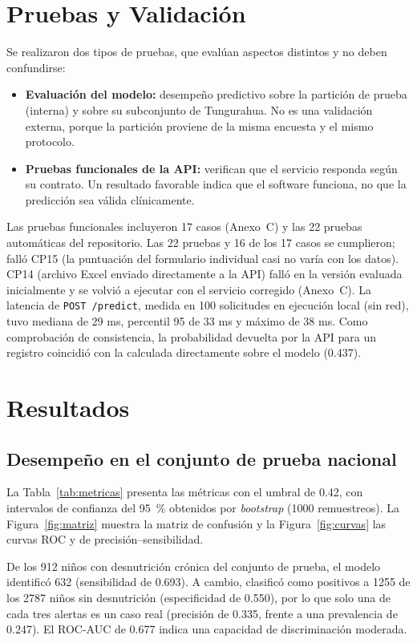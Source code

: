\section{Pruebas y Validación}
Se realizaron dos tipos de pruebas, que evalúan aspectos distintos y no deben confundirse:
\begin{itemize}
  \item \textbf{Evaluación del modelo:} desempeño predictivo sobre la partición de prueba (interna) y sobre su subconjunto de Tungurahua. No es una validación externa, porque la partición proviene de la misma encuesta y el mismo protocolo.
  \item \textbf{Pruebas funcionales de la API:} verifican que el servicio responda según su contrato. Un resultado favorable indica que el software funciona, no que la predicción sea válida clínicamente.
\end{itemize}

Las pruebas funcionales incluyeron 17 casos (Anexo~C) y las 22 pruebas automáticas del repositorio. Las 22 pruebas y 16 de los 17 casos se cumplieron; falló CP15 (la puntuación del formulario individual casi no varía con los datos). CP14 (archivo Excel enviado directamente a la API) falló en la versión evaluada inicialmente y se volvió a ejecutar con el servicio corregido (Anexo~C). La latencia de \texttt{POST /predict}, medida en 100 solicitudes en ejecución local (sin red), tuvo mediana de 29 ms, percentil 95 de 33 ms y máximo de 38 ms. Como comprobación de consistencia, la probabilidad devuelta por la API para un registro coincidió con la calculada directamente sobre el modelo (0.437).

\section{Resultados}
\subsection{Desempeño en el conjunto de prueba nacional}
La Tabla~\ref{tab:metricas} presenta las métricas con el umbral de 0.42, con intervalos de confianza del \SI{95}{\percent} obtenidos por \textit{bootstrap} (1000 remuestreos). La Figura~\ref{fig:matriz} muestra la matriz de confusión y la Figura~\ref{fig:curvas} las curvas ROC y de precisión--sensibilidad.

De los 912 niños con desnutrición crónica del conjunto de prueba, el modelo identificó 632 (sensibilidad de 0.693). A cambio, clasificó como positivos a \num{1255} de los \num{2787} niños sin desnutrición (especificidad de 0.550), por lo que solo una de cada tres alertas es un caso real (precisión de 0.335, frente a una prevalencia de 0.247). El ROC-AUC de 0.677 indica una capacidad de discriminación moderada.


